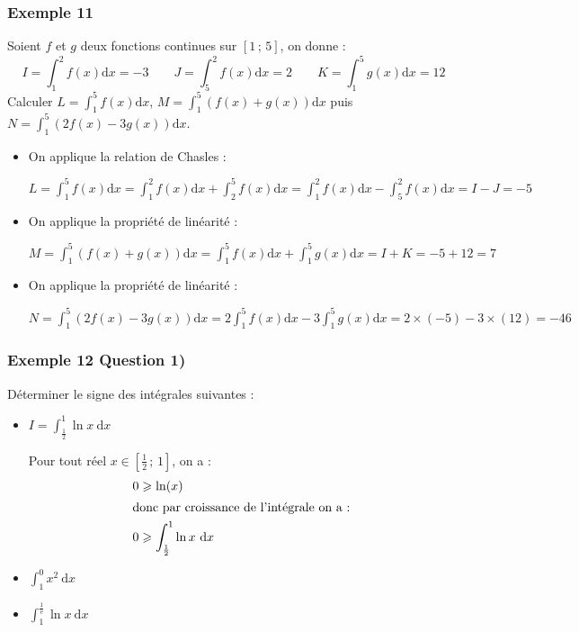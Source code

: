 \documentclass[11pt, hyperref={urlcolor=red,%
            linkcolor=blue, %
            colorlinks=true}]{beamer}
\newcommand{\Interff}[2]{\left[#1\, ;\, #2\right]}
\newcommand{\dx}{\ensuremath{\text{d}x}}		%
\newcommand{\integralex}[3]{\int_{#1}^{#2} #3 \ \dx}
\begin{document}
\begin{frame}
\frametitle{Exemple  11}
\label{exemple11}

Soient $f$ et $g$ deux fonctions continues sur $\Interff{1}{5}$, on donne :
$$I=\int_{1}^{2} f(x)\dx=-3   \qquad J=\int_{5}^{2} f(x)\dx=2 \qquad  K=\int_{1}^{5} g(x)\dx=12$$
Calculer $L=\int_{1}^{5} f(x)\dx$, $M=\int_{1}^{5} (f(x)+g(x))\dx$ puis $N=\int_{1}^{5} (2f(x)-3g(x))\dx$.

\begin{itemize}
	
\item  On applique la relation de Chasles : 

$L=\int_{1}^{5} f(x)\dx =\int_{1}^{2} f(x)\dx + \int_{2}^{5} f(x)\dx  = \int_{1}^{2} f(x)\dx  - \int_{5}^{2} f(x)\dx = I - J=-5 $

\item On applique la propriété de linéarité  :

$M=\int_{1}^{5} (f(x)+g(x))\dx = \int_{1}^{5} f(x)\dx  + \int_{1}^{5} g(x)\dx  = I + K = -5+12=7$


\item On applique la propriété de linéarité  :

$N=\int_{1}^{5} (2f(x)-3g(x))\dx=2\int_{1}^{5}f(x)\dx - 3 \int_{1}^{5}g(x)\dx = 2 \times (-5) -3 \times (12)= -46$

\end{itemize}


\end{frame}


\begin{frame}
\frametitle{Exemple  12 Question 1)}
\label{exemple12}


Déterminer le signe des intégrales suivantes :

\begin{itemize}
\item $I=\integralex{\frac{1}{2}}{1}{\ln x}$

Pour tout réel $x \in \Interff{\frac{1}{2}}{1}$, on a  :
\pause\begin{align*}
  0   & \geqslant \ln(x) \\
 \intertext{donc par croissance de l'intégrale on a : }
 0 & \geqslant \integralex{\frac{1}{2}}{1}{\ln x}
\end{align*}

\item $\integralex{1}{0}{x^{2}}$
\item $\integralex{1}{\frac{1}{\text{e}}}{\ln x}$
\end{itemize}



\end{frame}
\end{document}
